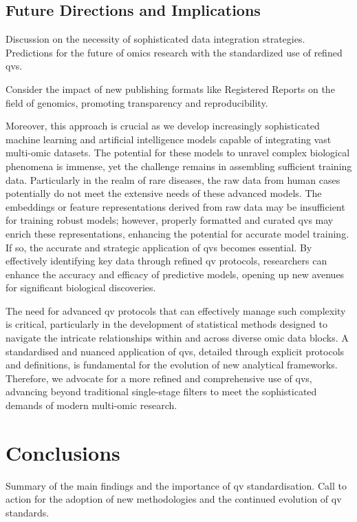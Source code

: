 \subsection{Future Directions and Implications} 

Discussion on the necessity of sophisticated data integration strategies. Predictions for the future of omics research with the standardized use of refined \ac{qv}s.

Consider the impact of new publishing formats like Registered Reports on the field of genomics, promoting transparency and reproducibility.
\cite{chambers2014instead}

Moreover, this approach is crucial as we develop increasingly sophisticated machine learning and artificial intelligence models capable of integrating vast multi-omic datasets. The potential for these models to unravel complex biological phenomena is immense, yet the challenge remains in assembling sufficient training data. Particularly in the realm of rare diseases, the raw data from human cases potentially do not meet the extensive needs of these advanced models. The embeddings or feature representations derived from raw data may be insufficient for training robust models; however, properly formatted and curated \ac{qv}s may enrich these representations, enhancing the potential for accurate model training. If so, the accurate and strategic application of \ac{qv}s becomes essential. By effectively identifying key data through refined \ac{qv} protocols, researchers can enhance the accuracy and efficacy of predictive models, opening up new avenues for significant biological discoveries.

The need for advanced \ac{qv} protocols that can effectively manage such complexity is critical, particularly in the development of statistical methods designed to navigate the intricate relationships within and across diverse omic data blocks. A standardised and nuanced application of \ac{qv}s, detailed through explicit protocols and definitions, is fundamental for the evolution of new analytical frameworks. Therefore, we advocate for a more refined and comprehensive use of \ac{qv}s, advancing beyond traditional single-stage filters to meet the sophisticated demands of modern multi-omic research. 

\section{Conclusions}
Summary of the main findings and the importance of \ac{qv} standardisation. Call to action for the adoption of new methodologies and the continued evolution of \ac{qv} standards.






